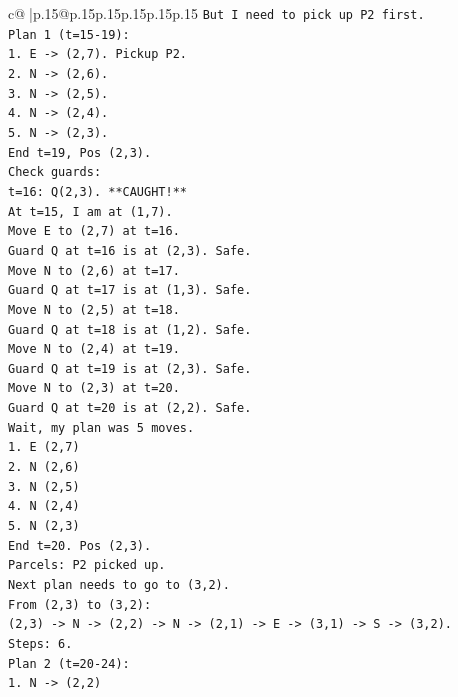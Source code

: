 \documentclass{article}
\begin{document}
{\begin{supertabular}{c@{$\;$}|p{.15\linewidth}@{}p{.15\linewidth}p{.15\linewidth}p{.15\linewidth}p{.15\linewidth}p{.15\linewidth}}
{{{\texttt{But I need to pick up P2 first.} \\
\texttt{Plan 1 (t=15{-}19):} \\
\texttt{1. E {-}> (2,7). Pickup P2.} \\
\texttt{2. N {-}> (2,6).} \\
\texttt{3. N {-}> (2,5).} \\
\texttt{4. N {-}> (2,4).} \\
\texttt{5. N {-}> (2,3).} \\
\texttt{End t=19, Pos (2,3).} \\
\texttt{Check guards:} \\
\texttt{t=16: Q(2,3). **CAUGHT!**} \\
\texttt{At t=15, I am at (1,7).} \\
\texttt{Move E to (2,7) at t=16.} \\
\texttt{Guard Q at t=16 is at (2,3). Safe.} \\
\texttt{Move N to (2,6) at t=17.} \\
\texttt{Guard Q at t=17 is at (1,3). Safe.} \\
\texttt{Move N to (2,5) at t=18.} \\
\texttt{Guard Q at t=18 is at (1,2). Safe.} \\
\texttt{Move N to (2,4) at t=19.} \\
\texttt{Guard Q at t=19 is at (2,3). Safe.} \\
\texttt{Move N to (2,3) at t=20.} \\
\texttt{Guard Q at t=20 is at (2,2). Safe.} \\
\texttt{Wait, my plan was 5 moves.} \\
\texttt{1. E (2,7)} \\
\texttt{2. N (2,6)} \\
\texttt{3. N (2,5)} \\
\texttt{4. N (2,4)} \\
\texttt{5. N (2,3)} \\
\texttt{End t=20. Pos (2,3).} \\
\texttt{Parcels: P2 picked up.} \\
\texttt{Next plan needs to go to (3,2).} \\
\texttt{From (2,3) to (3,2):} \\
\texttt{(2,3) {-}> N {-}> (2,2) {-}> N {-}> (2,1) {-}> E {-}> (3,1) {-}> S {-}> (3,2).} \\
\texttt{Steps: 6.} \\
\texttt{Plan 2 (t=20{-}24):} \\
\texttt{1. N {-}> (2,2)} \\
}}}
\end{supertabular}}
\end{document}
